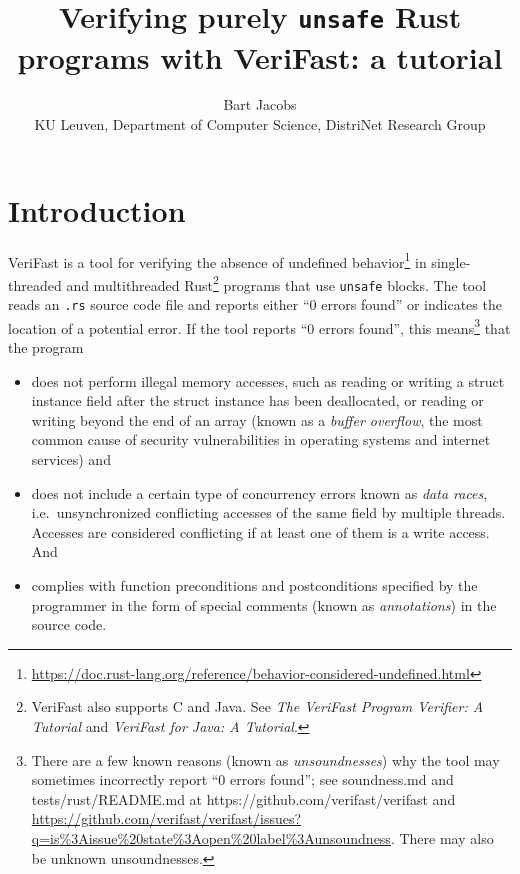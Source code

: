 \documentclass{article}
\title{Verifying purely \texttt{unsafe} Rust programs with VeriFast: a tutorial}
\author{Bart Jacobs\\
{\small KU Leuven, Department of Computer Science, DistriNet Research Group}}
\begin{document}
\maketitle

\setcounter{tocdepth}{1}
\tableofcontents

\newpage

\section{Introduction}

VeriFast is a tool for verifying the absence of undefined behavior\footnote{\url{https://doc.rust-lang.org/reference/behavior-considered-undefined.html}} in single-threaded and multithreaded Rust\footnote{VeriFast also supports C and Java. See \emph{The VeriFast Program Verifier: A Tutorial} and \emph{VeriFast for Java: A Tutorial}.}
programs that use \lstinline|unsafe| blocks. The tool reads an
\verb|.rs| source code file and reports either ``0 errors found'' or
indicates the location of a potential error. If the tool
reports ``0 errors found'', this means\footnote{There are a few
known reasons (known as \emph{unsoundnesses}) why the tool may
sometimes incorrectly report ``0 errors found''; see \textsf{soundness.md} and \textsf{tests/rust/README.md} at \textsf{https://github.com/verifast/verifast} and \url{https://github.com/verifast/verifast/issues?q=is\%3Aissue\%20state\%3Aopen\%20label\%3Aunsoundness}. There
may also be unknown unsoundnesses.} that the program
\begin{itemize}
\item does not perform illegal memory accesses, such as reading or
    writing a struct instance field after the struct instance has been
    deallocated, or reading or writing beyond the end of an array (known as
    a \emph{buffer overflow}, the most common cause of security
    vulnerabilities in operating systems and internet services) and
\item does not include a certain type of concurrency errors known as
    \emph{data races}, i.e.~unsynchronized conflicting accesses of the
    same field by multiple threads. Accesses are considered
    conflicting if at least one of them is a write access. And
\item complies with function preconditions and
    postconditions specified by the programmer in the form
    of special comments (known as \emph{annotations}) in
    the source code.
\end{itemize}
\end{document}
